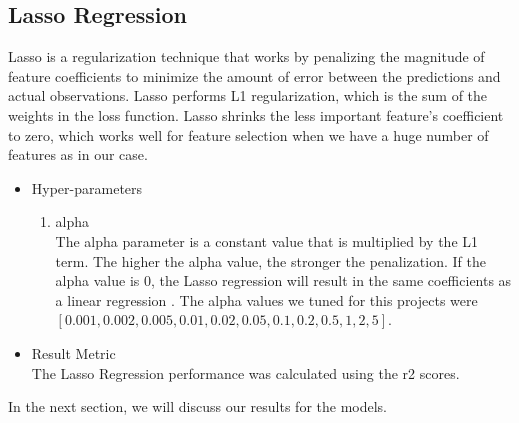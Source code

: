 \subsection{Lasso Regression}
 Lasso is a regularization technique that works by penalizing the magnitude of feature coefficients to minimize the amount of error between the predictions and actual observations. Lasso performs L1 regularization, which is the sum of the weights in the loss function. Lasso shrinks the less important feature’s coefficient to zero, which works well for feature selection when we have a huge number of features as in our case. 
\begin{itemize}
    \item Hyper-parameters
\begin{enumerate}
    \item alpha \\
    The alpha parameter is a constant value that is multiplied by the L1 term. The higher the alpha value, the stronger the penalization. If the alpha value is $0$, the Lasso regression will result in the same coefficients as a linear regression \cite{ChrisAlbon}. The alpha values we tuned for this projects were $[0.001,0.002,0.005,0.01,0.02,0.05,0.1,0.2,0.5,1,2,5]$.
  \end{enumerate}
  \item Result Metric\\
     The Lasso Regression performance was calculated using the r2 scores. 

 \end{itemize}
 In the next section, we will discuss our results for the models. 
  
  
